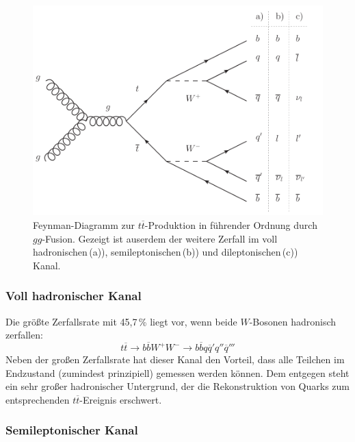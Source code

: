 \begin{figure}[ht]
	\centering
	\includegraphics[scale=0.80]{Theorie/leadingorderttproduction-eps-converted-to}
	\caption[Feynman-Diagramm zur $t\overline{t}$-Produktion in f"uhrender Ordnung durch $gg$-Fusion]{Feynman-Diagramm zur $t\overline{t}$-Produktion in f\"uhrender Ordnung durch $gg$-Fusion. Gezeigt ist au\s{}serdem der weitere Zerfall im voll hadronischen\,(a)), semi\-lep\-tonischen\,(b)) und dileptonischen\,(c)) Kanal.}
	\label{leadingorderttbar}
\end{figure}

\subsubsection*{Voll hadronischer Kanal}
Die gr\"o\ss{}te Zerfallsrate mit 45,7\,\% liegt vor, wenn beide $W$-Bosonen hadronisch zerfallen:
\begin{equation*}
t\overline{t}\rightarrow b\overline{b}W^{+}W^{-}\rightarrow b\overline{b}q\overline{q}'q''\overline{q}'''
\end{equation*}
Neben der gro\ss{}en Zerfallsrate hat dieser Kanal den Vorteil, dass alle Teilchen im Endzustand (zumindest prinzipiell) gemessen werden k\"onnen. Dem entgegen steht ein sehr gro\ss{}er hadronischer Untergrund, der die Rekonstruktion von Quarks zum entsprechenden $t\overline{t}$-Ereignis erschwert.

\subsubsection*{Semileptonischer Kanal}

